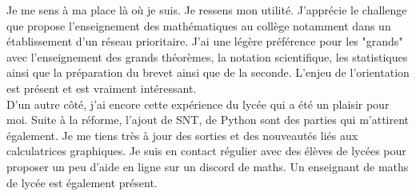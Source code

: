 \documentclass[11pt]{article}
\begin{document}
Je me sens à ma place là où je suis. Je ressens mon utilité. J'apprécie le challenge que propose l'enseignement des mathématiques au collège notamment dans un établissement d'un réseau prioritaire. J'ai une légère préférence pour les "grands" avec l'enseignement des grands théorèmes, la notation scientifique, les statistiques ainsi que la préparation du brevet ainsi que de la seconde. L'enjeu de l'orientation est présent et est vraiment intéressant.\\

 D'un autre côté, j'ai encore cette expérience du lycée qui a été un plaisir pour moi. Suite à la réforme, l'ajout de SNT, de Python sont des parties qui m'attirent également. Je me tiens très à jour des sorties et des nouveautés liés aux calculatrices graphiques. Je suis en contact régulier avec des élèves de lycées pour proposer un peu d'aide en ligne sur un discord de maths. Un enseignant de maths de lycée est également présent. 
\end{document}

